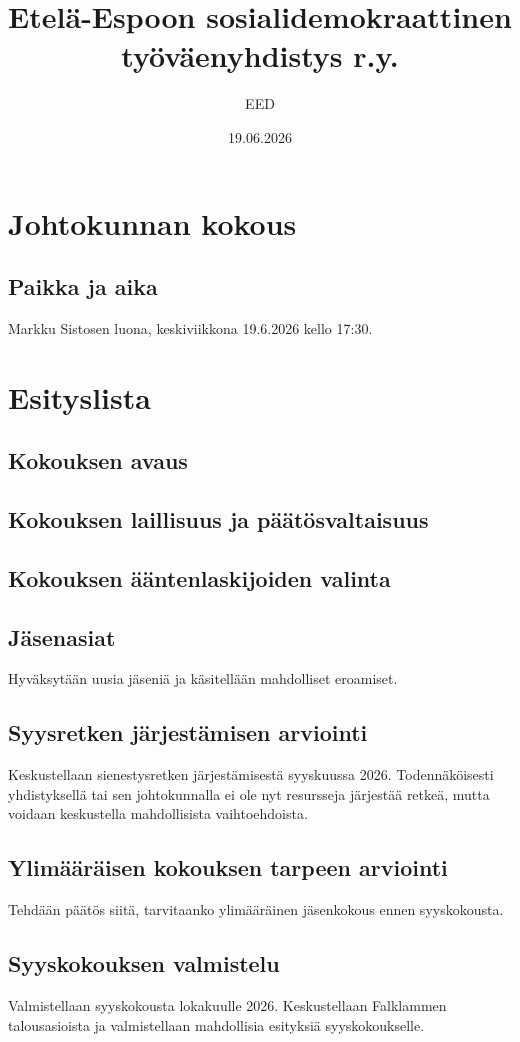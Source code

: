 \documentclass[a4paper,12pt]{article}
\title{Etelä-Espoon sosialidemokraattinen työväenyhdistys r.y.}
\author{EED}
\date{19.06.2026}
\begin{document}
\maketitle
\tableofcontents
\section*{Johtokunnan kokous}
\subsection*{Paikka ja aika}
Markku Sistosen luona, keskiviikkona 19.6.2026 kello 17:30.
\section*{Esityslista}
\subsection{Kokouksen avaus}
\subsection{Kokouksen laillisuus ja päätösvaltaisuus}
\subsection{Kokouksen ääntenlaskijoiden valinta}
\subsection{Jäsenasiat}
Hyväksytään uusia jäseniä ja käsitellään mahdolliset eroamiset.
\subsection{Syysretken järjestämisen arviointi}
Keskustellaan sienestysretken järjestämisestä syyskuussa 2026. Todennäköisesti yhdistyksellä tai sen johtokunnalla ei ole nyt resursseja järjestää retkeä, mutta voidaan keskustella mahdollisista vaihtoehdoista.
\subsection{Ylimääräisen kokouksen tarpeen arviointi}
Tehdään päätös siitä, tarvitaanko ylimääräinen jäsenkokous ennen syyskokousta.
\subsection{Syyskokouksen valmistelu}
Valmistellaan syyskokousta lokakuulle 2026. Keskustellaan Falklammen talousasioista ja valmistellaan mahdollisia esityksiä syyskokoukselle.
\end{document}
